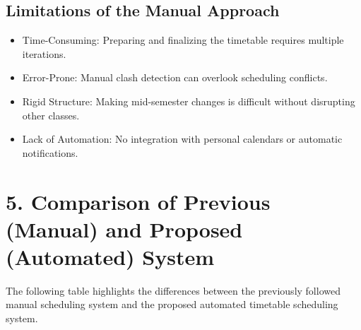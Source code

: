 \documentclass[12pt]{article}
\begin{document}
\subsection{Limitations of the Manual Approach}
\begin{itemize}
\item Time-Consuming: Preparing and finalizing the timetable requires multiple iterations.
\item Error-Prone: Manual clash detection can overlook scheduling conflicts.
\item Rigid Structure: Making mid-semester changes is difficult without disrupting other classes.
\item Lack of Automation: No integration with personal calendars or automatic notifications.
\end{itemize}
\newpage

\section*{5. Comparison of Previous (Manual) and Proposed (Automated) System}

The following table highlights the differences between the previously followed manual scheduling system 
and the proposed automated timetable scheduling system.  
\end{document}
